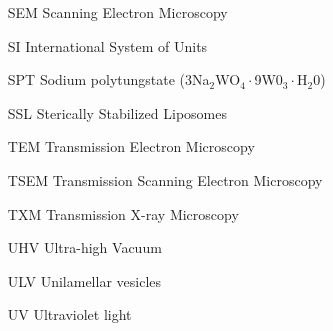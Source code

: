\begin{itemize}
        \item   [SEM] Scanning Electron Microscopy
        \item   [SI] International System of Units
        \item   [SPT] Sodium polytungstate (3Na$_2$WO$_4\cdot$9W0$_3\cdot$H$_2$0)
        \item   [SSL] Sterically Stabilized Liposomes
        \item   [TEM] Transmission Electron Microscopy
        \item   [TSEM] Transmission Scanning Electron Microscopy
        \item   [TXM] Transmission X-ray Microscopy  
        \item   [UHV] Ultra-high Vacuum      
        \item   [ULV] Unilamellar vesicles
        \item   [UV] Ultraviolet light

        

\end{itemize}

\clearpage
